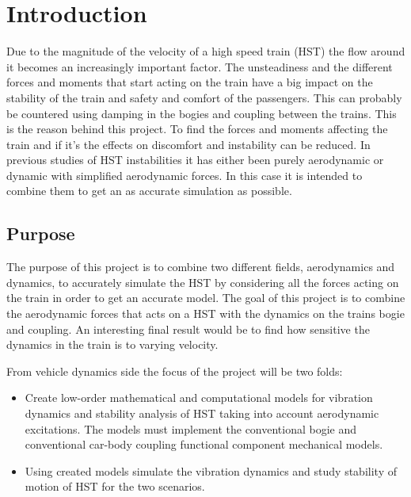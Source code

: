 \section{Introduction}
Due to the magnitude of the velocity of a high speed train (HST) the flow around it becomes an increasingly important factor. 
The unsteadiness and the different forces and moments that start acting on the train have a big impact on the stability of the train 
and safety and comfort of the passengers. This can probably be countered using damping in the bogies and coupling between the trains.
This is the reason behind this project. To find the forces and moments affecting the train 
and if it's the effects on discomfort and instability can be reduced.
In previous studies of HST instabilities it has either been purely aerodynamic or dynamic with simplified aerodynamic forces.
In this case it is intended to combine them to get an as accurate simulation as possible. 

\subsection{Purpose}
The purpose of this project is to combine two different fields, 
aerodynamics and dynamics, to accurately simulate the HST by
considering all the forces acting on the train in order to get an accurate model.
The goal of this project is to combine the aerodynamic forces that acts on a HST 
with the dynamics on the trains bogie and coupling. 
An interesting final result would be to find how sensitive the dynamics in the train is to varying velocity.

From vehicle dynamics side the focus of the project will be two folds:
\begin{itemize}
\item Create low-order mathematical and computational models for vibration dynamics and stability analysis of HST taking into account 
aerodynamic excitations. 
The models must implement the conventional bogie and conventional car-body coupling functional component mechanical models.
\item Using created models simulate the vibration dynamics and study stability of motion of HST for the two scenarios.
\end{itemize}

